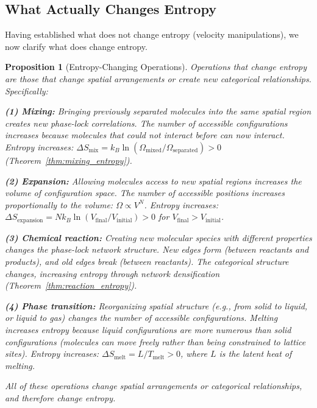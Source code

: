 \documentclass[12pt,a4paper]{article}
\newtheorem{proposition}[theorem]{Proposition}
\theoremstyle{definition}
\theoremstyle{remark}
\begin{document}
\subsection{What Actually Changes Entropy}

Having established what does not change entropy (velocity manipulations), we now clarify what does change entropy.

\begin{proposition}[Entropy-Changing Operations]
\label{prop:entropy_changing}
Operations that change entropy are those that change spatial arrangements or create new categorical relationships. Specifically:

\textbf{(1) Mixing:} Bringing previously separated molecules into the same spatial region creates new phase-lock correlations. The number of accessible configurations increases because molecules that could not interact before can now interact. Entropy increases: $\Delta S_{\text{mix}} = k_B \ln(\Omega_{\text{mixed}} / \Omega_{\text{separated}}) > 0$ (Theorem~\ref{thm:mixing_entropy}).

\textbf{(2) Expansion:} Allowing molecules access to new spatial regions increases the volume of configuration space. The number of accessible positions increases proportionally to the volume: $\Omega \propto V^N$. Entropy increases: $\Delta S_{\text{expansion}} = N k_B \ln(V_{\text{final}} / V_{\text{initial}}) > 0$ for $V_{\text{final}} > V_{\text{initial}}$.

\textbf{(3) Chemical reaction:} Creating new molecular species with different properties changes the phase-lock network structure. New edges form (between reactants and products), and old edges break (between reactants). The categorical structure changes, increasing entropy through network densification (Theorem~\ref{thm:reaction_entropy}).

\textbf{(4) Phase transition:} Reorganizing spatial structure (e.g., from solid to liquid, or liquid to gas) changes the number of accessible configurations. Melting increases entropy because liquid configurations are more numerous than solid configurations (molecules can move freely rather than being constrained to lattice sites). Entropy increases: $\Delta S_{\text{melt}} = L / T_{\text{melt}} > 0$, where $L$ is the latent heat of melting.

All of these operations change spatial arrangements or categorical relationships, and therefore change entropy.
\end{proposition}
\end{document}
